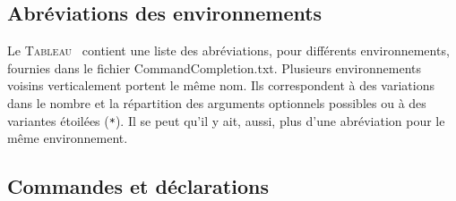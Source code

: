 \documentclass[11pt,french]{article}
\newcommand{\esckey}{\textsf{Esc}}
\newcommand{\To}{\,\(\to\)\,}
\newcommand{\CCT}{\textsf{CommandCompletion.txt}}
\begin{document}

\subsection*{Abréviations des environnements}

Le \textsc{Tableau}~ contient une liste des abréviations, pour différents environnements, 
fournies dans le fichier \CCT. Plusieurs environnements voisins verticalement portent le même nom. Ils correspondent à des variations dans le nombre et la répartition des arguments optionnels possibles ou à des variantes étoilées (\texttt{*}). Il se peut qu'il y ait, aussi, plus d'une abréviation pour le même environnement.


\subsection*{Commandes et déclarations}
\end{document}
